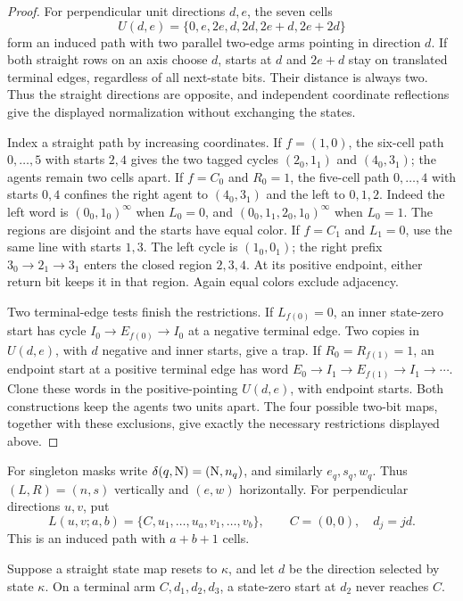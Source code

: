 \begin{proof}
For perpendicular unit directions $d,e$, the seven cells
\[
 U(d,e)=\{0,e,2e,d,2d,2e+d,2e+2d\}
\]
form an induced path with two parallel two-edge arms pointing in direction
$d$. If both straight rows on an axis choose $d$, starts at $d$ and
$2e+d$ stay on translated terminal edges, regardless of all next-state
bits. Their distance is always two. Thus the straight directions are
opposite, and independent coordinate reflections give the displayed
normalization without exchanging the states.

Index a straight path by increasing coordinates. If $f=(1,0)$, the
six-cell path $0,\ldots,5$ with starts $2,4$ gives the two tagged cycles
$(2_0,1_1)$ and $(4_0,3_1)$; the agents remain two cells apart.
If $f=C_0$ and $R_0=1$, the five-cell path $0,\ldots,4$ with starts
$0,4$ confines the right agent to $(4_0,3_1)$ and the left to $0,1,2$.
Indeed the left word is $(0_0,1_0)^\infty$ when $L_0=0$, and
$(0_0,1_1,2_0,1_0)^\infty$ when $L_0=1$.
The regions are disjoint and the starts have equal color.
If $f=C_1$ and $L_1=0$, use the same line with starts $1,3$.
The left cycle is $(1_0,0_1)$; the right prefix
$3_0\to2_1\to3_1$ enters the closed region $2,3,4$.
At its positive endpoint, either return bit keeps it in that region.
Again equal colors exclude adjacency.

Two terminal-edge tests finish the restrictions. If $L_{f(0)}=0$,
an inner state-zero start has cycle
$I_0\to E_{f(0)}\to I_0$ at a negative terminal edge. Two copies
in $U(d,e)$, with $d$ negative and inner starts, give a trap.
If $R_0=R_{f(1)}=1$, an endpoint start at a positive terminal edge has
word $E_0\to I_1\to E_{f(1)}\to I_1\to\cdots$.
Clone these words in the positive-pointing $U(d,e)$, with endpoint
starts. Both constructions keep the agents two units apart.
The four possible two-bit maps, together with these exclusions, give
exactly the necessary restrictions displayed above.
\end{proof}

For singleton masks write
$\delta(q,\mathrm{N})=(\mathrm{N},n_q)$, and similarly $e_q,s_q,w_q$.
Thus $(L,R)=(n,s)$ vertically and $(e,w)$ horizontally.
For perpendicular directions $u,v$, put
\[
 L(u,v;a,b)=\{C,u_1,\ldots,u_a,v_1,\ldots,v_b\},
 \qquad C=(0,0),\quad d_j=jd.
\]
This is an induced path with $a+b+1$ cells.

\begin{lemma}\label{u:pocket}
Suppose a straight state map resets to $\kappa$, and let $d$ be the
direction selected by state $\kappa$. On a terminal arm
$C,d_1,d_2,d_3$, a state-zero start at $d_2$ never reaches $C$.
\end{lemma}

